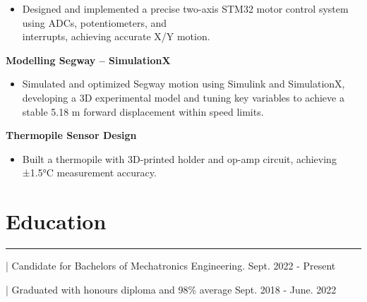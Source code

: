 \documentclass{article}
\begin{document}
\vspace{-0.2cm}
\begin{itemize}[leftmargin=1.5cm]
    \item Designed and implemented a precise two-axis STM32 motor control system using ADCs, potentiometers, and \\ interrupts, achieving accurate X/Y motion.
\end{itemize}


\textbf{\hspace{-0.10cm} Modelling Segway – SimulationX} \hspace{5.3cm}

\vspace{-0.2cm}
\begin{itemize}[leftmargin=1.5cm]
    \item Simulated and optimized Segway motion using Simulink and SimulationX, developing a 3D experimental model and tuning key variables to achieve a stable 5.18 m forward displacement within speed limits.
\end{itemize}


\textbf{\hspace{-0.10cm} Thermopile Sensor Design} \hspace{5.3cm}

\vspace{-0.2cm}
\begin{itemize}[leftmargin=1.5cm]
    \item Built a thermopile with 3D-printed holder and op-amp circuit, achieving ±1.5°C measurement accuracy.
\end{itemize}



\vspace{-0.5cm}
\section*{\hspace{0.4cm} \large Education}
\begin{center}
    \vspace{-0.5cm}
    \rule{\textwidth}{0.1pt}
\end{center}


\begin{description}
    \vspace{-0.5cm}
    \item[\hspace{0.6cm}University of Waterloo] | Candidate for Bachelors of Mechatronics Engineering. \hspace{2.3cm} {\small Sept. 2022 - Present}
    \vspace{-0.2cm}
    \item[\hspace{0.6cm}Secondary School ] | Graduated with honours diploma and 98\% average \hspace{3.1cm} {\small Sept. 2018 - June. 2022}
\end{description}
\end{document}
